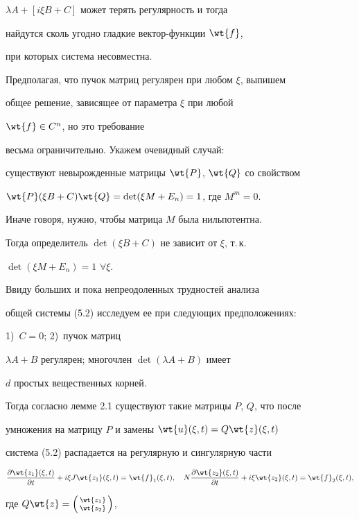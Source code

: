 $\lambda A+[i\xi B+C]$ может терять регулярность и тогда


найдутся сколь угодно гладкие вектор-функции $\wt {f}$,


при которых система несовместна.


Предполагая, что пучок матриц регулярен при любом $\xi$, выпишем


общее решение, зависящее от параметра $\xi $ при любой


$\wt {f}\in C^n$, но это требование


весьма ограничительно. Укажем очевидный случай:


существуют невырожденные матрицы $\wt {P}$, $\wt {Q}$ со свойством


$\wt {P}(\xi B+C)\wt {Q}=\det (\xi M+E_n)=1$, где $M^m=0$.


Иначе говоря, нужно, чтобы матрица $M$ была нильпотентна.


Тогда определитель $\det(\xi B+C)$ не зависит от $\xi$, т.\,к.


$\det (\xi M+E_n)=1$\; $\forall \xi $.





Ввиду больших и пока непреодоленных трудностей анализа


общей системы (5.2) исследуем ее при следующих предположениях:


1)~$C=0$; 2)~пучок матриц


$\lambda A+ B$ регулярен; многочлен $\det(\lambda A+ B)$ имеет


$d$ простых вещественных корней.


Тогда согласно лемме 2.1 существуют такие матрицы $P$, $Q$, что после


умножения на матрицу $P$ и замены $\wt{u}(\xi,t)=Q\wt{z}(\xi,t)$


система (5.2) распадается на регулярную и сингулярную части


\begin{equation}


\frac{\partial\wt{z_1}(\xi,t)}{\partial{t}}+i\xi J\wt{z_1}(\xi,t)=


\wt{f}_1(\xi,t),\quad


N\frac{\partial\wt{z_2}(\xi,t)}{\partial{t}}+i\xi\wt{z_2}(\xi,t)=


\wt{f}_2(\xi,t),


\end{equation}


где $Q\wt{z}=


\left( \begin{smallmatrix} \wt{z_1} \\ \wt{z_2} \end{smallmatrix}\right)$,


